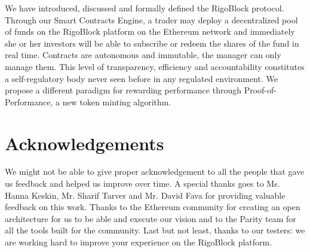 \documentclass[9pt,oneside]{amsart}
\begin{document}
\begin{multicols}{2}
We have introduced, discussed and formally defined the RigoBlock protocol. Through our Smart Contracts Engine, a trader may deploy a decentralized pool of funds on the RigoBlock platform on the Ethereum network and immediately she or her investors will be able to subscribe or redeem the shares of the fund in real time. Contracts are autonomous and immutable, the manager can only manage them. This level of transparency, efficiency and accountability constitutes a self-regulatory body never seen before in any regulated environment. We propose a different paradigm for rewarding performance through Proof-of-Performance, a new token minting algorithm.

\section{Acknowledgements}
We might not be able to give proper acknowledgement to all the people that gave us feedback and helped us improve over time. A special thanks goes to Ms. Hanna Keskin, Mr. Sharif Tarver and Mr. David Fava for providing valuable feedback on this work. Thanks to the Ethereum community for creating an open architecture for us to be able and execute our vision and to the Parity team for all the tools built for the community. Last but not least, thanks to our testers: we are working hard to improve your experience on the RigoBlock platform.

\end{multicols}
\end{document}
